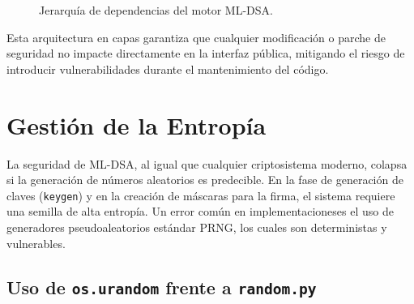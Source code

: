 \documentclass[11pt, a4paper]{report}
\theoremstyle{definition}
\begin{document}
\begin{figure}[H]
{
    }
    \caption{Jerarquía de dependencias del motor ML-DSA.}
    \label{fig:arquitectura_capas}
\end{figure}

Esta arquitectura en capas garantiza que cualquier modificación o parche de seguridad no impacte directamente en la interfaz pública, mitigando el riesgo de introducir vulnerabilidades durante el mantenimiento del código.

\section{Gestión de la Entropía}
\label{sec:entropia}

La seguridad de ML-DSA, al igual que cualquier criptosistema moderno, colapsa si la generación de números aleatorios es predecible. En la fase de generación de claves (\texttt{keygen}) y en la creación de máscaras para la firma, el sistema requiere una semilla de alta entropía. Un error común en implementacioneses el uso de generadores pseudoaleatorios estándar PRNG, los cuales son deterministas y vulnerables.

\subsection{Uso de \texttt{os.urandom} frente a \texttt{random.py}}
\end{document}
